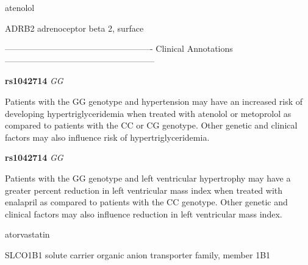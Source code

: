 \documentclass{resume} %
\begin{document}
\begin{rSection}{ atenolol }
\begin{rSubsection}{ ADRB2 }{ adrenoceptor beta 2, surface }{}{}
\item[] ---------------------------------------------------- Clinical Annotations -----------------------------------------------------\newline
\item \textbf{ rs1042714 } \textit{ GG }
\item[] Patients with the GG genotype and hypertension may have an increased risk of developing hypertriglyceridemia when treated with atenolol or metoprolol as compared to patients with the CC or CG genotype. Other genetic and clinical factors may also influence risk of hypertriglyceridemia. \item \textbf{ rs1042714 } \textit{ GG }
\item[] Patients with the GG genotype and left ventricular hypertrophy may have a greater percent reduction in left ventricular mass index when treated with enalapril as compared to patients with the CC genotype. Other genetic and clinical factors may also influence reduction in left ventricular mass index. 
\end{rSubsection}

\end{rSection}\begin{rSection}{ atorvastatin }
\item[]

\begin{rSubsection}{ SLCO1B1 }{ solute carrier organic anion transporter family, member 1B1 }{}{}
\item[]


\end{rSubsection}
\end{rSection}
\end{document}
